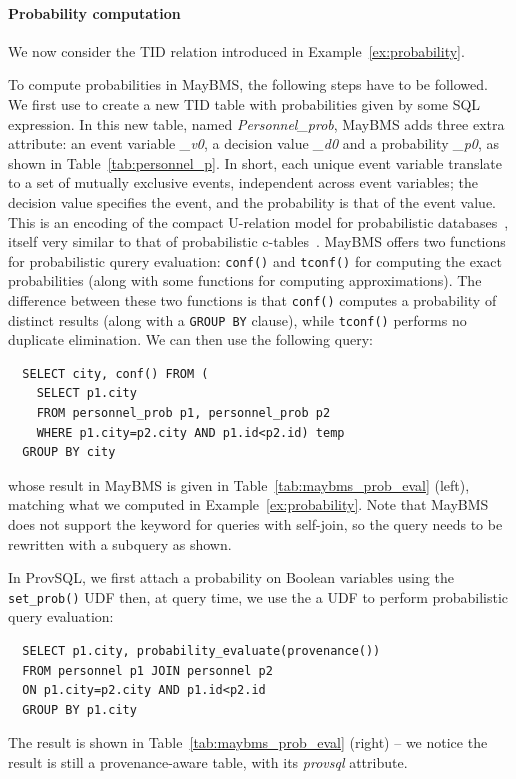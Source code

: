 \begin{toappendix}
\paragraph*{Probability computation}
We now consider the
TID relation introduced in Example~\ref{ex:probability}.

To compute probabilities in MayBMS, the following steps have to be
followed. We first use  to create a new
TID table with  probabilities given by some SQL expression. In this new table, named \emph{Personnel\_prob}, MayBMS
adds three extra attribute: an event variable \emph{\_v0}, a decision
value \emph{\_d0} and a probability \emph{\_p0}, as shown in
Table~\ref{tab:personnel_p}. In short, each unique event variable translate to a
set of mutually exclusive events, independent across event variables;
the decision value specifies the event, and the probability is that of
the event value. This is an encoding of the compact U-relation model for
probabilistic databases~\cite{DBLP:conf/icde/AntovaJKO08}, itself very
similar to that of probabilistic c-tables~\cite{greent06}.
MayBMS offers two functions for probabilistic qurery evaluation:
\texttt{conf()} and \texttt{tconf()} for computing the exact
probabilities (along with some functions for computing approximations).
The difference between these two functions is that
\texttt{conf()} computes a probability of distinct results
(along with a \texttt{GROUP BY} clause), while
\texttt{tconf()} performs no duplicate elimination.
We can then use the following query:
\begin{verbatim}
  SELECT city, conf() FROM (
    SELECT p1.city
    FROM personnel_prob p1, personnel_prob p2
    WHERE p1.city=p2.city AND p1.id<p2.id) temp
  GROUP BY city
\end{verbatim}
whose result in MayBMS is given in Table~\ref{tab:maybms_prob_eval}
(left), matching what we computed in Example~\ref{ex:probability}.
Note that MayBMS does not support the  keyword
for queries with self-join, so the query needs to be rewritten with a
subquery as shown.

In ProvSQL, we first attach a probability on Boolean variables using the
\texttt{set_prob()} UDF then, at query time, we use the
a UDF to perform probabilistic
query evaluation:
\begin{verbatim}
  SELECT p1.city, probability_evaluate(provenance())
  FROM personnel p1 JOIN personnel p2
  ON p1.city=p2.city AND p1.id<p2.id
  GROUP BY p1.city
\end{verbatim}
The result is shown in Table~\ref{tab:maybms_prob_eval} (right)
-- we
notice the result is still a provenance-aware table, with its
\emph{provsql} attribute.
\end{toappendix}
